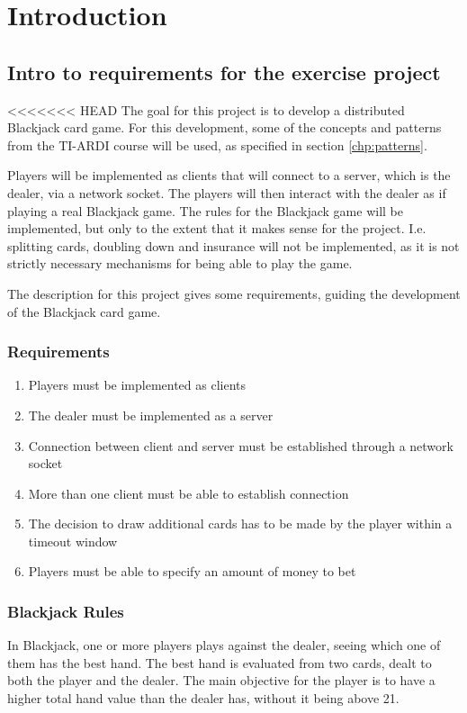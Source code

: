 \chapter{Introduction}
\label{chp:intro}

\section{Intro to requirements for the exercise project}

<<<<<<< HEAD
The goal for this project is to develop a distributed Blackjack card game. For this development, some of the concepts and patterns from the TI-ARDI course will be used, as specified in section \ref{chp:patterns}. 

Players will be implemented as clients that will connect to a server, which is the dealer, via a network socket. The players will then interact with the dealer as if playing a real Blackjack game. The rules for the Blackjack game will be implemented, but only to the extent that it makes sense for the project. I.e. splitting cards, doubling down and insurance will not be implemented, as it is not strictly necessary mechanisms for being able to play the game. 

The description for this project gives some requirements, guiding the development of the Blackjack card game.
\subsection{Requirements}
\begin{enumerate}  
	\item Players must be implemented as clients
	\item The dealer must be implemented as a server
	\item Connection between client and server must be established through a network socket
	\item More than one client must be able to establish connection
	\item The decision to draw additional cards has to be made by the player within a timeout window
	\item Players must be able to specify an amount of money to bet
\end{enumerate}

\subsection{Blackjack Rules}
In Blackjack, one or more players plays against the dealer, seeing which one of them has the best hand. The best hand is evaluated from two cards, dealt to both the player and the dealer. The main objective for the player is to have a higher total hand value than the dealer has, without it being above 21.
 
